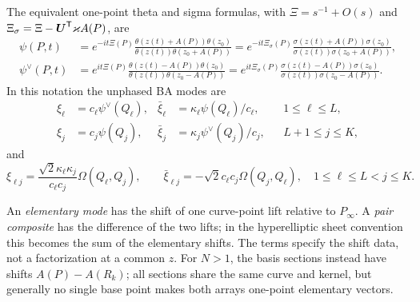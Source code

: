 The equivalent one-point theta and sigma formulas, with
$\Xi=s^{-1}+O(s)$ and
$\Xi_\sigma=\Xi-\boldsymbol U^{\mathsf T}\varkappa A(P)$, are
\begin{equation}\label{eq:general-BA-theta}
\begin{aligned}
 \psi(P,t)
 &=e^{-it\Xi(P)}
 \tfrac{\theta(z(t)+A(P))\theta(z_0)}
 {\theta(z(t))\theta(z_0+A(P))}
 =e^{-it\Xi_\sigma(P)}
 \tfrac{\sigma(z(t)+A(P))\sigma(z_0)}
 {\sigma(z(t))\sigma(z_0+A(P))},\\[4pt]
 \psi^\vee(P,t)
 &=e^{it\Xi(P)}
 \tfrac{\theta(z(t)-A(P))\theta(z_0)}
 {\theta(z(t))\theta(z_0-A(P))}
 =e^{it\Xi_\sigma(P)}
 \tfrac{\sigma(z(t)-A(P))\sigma(z_0)}
 {\sigma(z(t))\sigma(z_0-A(P))}.
\end{aligned}
\end{equation}
In this notation the unphased BA modes are
\begin{equation}\label{eq:general-elementary-modes}
\begin{aligned}
 \xi_{\ell}&=c_{\ell} \psi^\vee(Q_{\ell}),&\bar{\xi}_{\ell}&=\kappa_{\ell} \psi(Q_{\ell})/c_{\ell},
 &&1\leq\ell\leq L,\\
 \xi_j&=c_j \psi(Q_j),&\bar{\xi}_j&=\kappa_j \psi^\vee(Q_j)/c_j,
 &&L+1\leq j\leq K,
\end{aligned}
\end{equation}
and
\begin{equation}\label{eq:general-pair-modes}
 \xi_{\ell j}=\frac{\sqrt2\kappa_{\ell}\kappa_j}{c_{\ell}c_j}\Omega(Q_{\ell},Q_j),
 \qquad \bar{\xi}_{\ell j}=-\sqrt2c_{\ell}c_j\Omega(Q_j,Q_{\ell}),
 \quad1\leq\ell\leq L<j\leq K.
\end{equation}

An \emph{elementary mode} has the shift of one curve-point lift
relative to $P_\infty$. A \emph{pair composite} has the difference
of the two lifts; in the hyperelliptic sheet convention this becomes
the sum of the elementary shifts. The terms specify the shift data,
not a factorization at a common $z$. For $N>1$, the basis sections
instead have shifts $A(P)-A(R_k)$; all sections share the same curve
and kernel, but generally no single base point makes both arrays
one-point elementary vectors.

